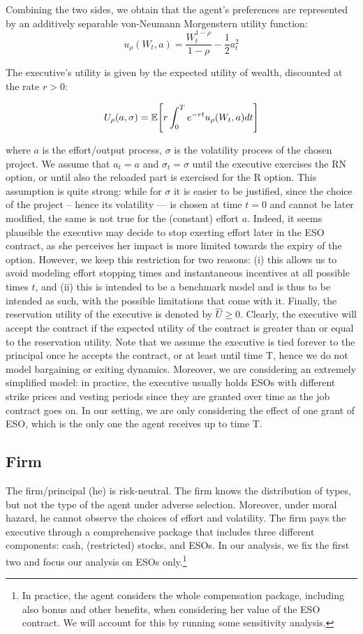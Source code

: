 Combining the two sides, we obtain that the agent's preferences are represented by an additively separable von-Neumann Morgenstern utility function:
$$ u_\rho (W_t, a) = \frac{W_t^{1-\rho}}{1-\rho} - \frac{1}{2}a_t^2 $$

The executive's utility is given by the expected utility of wealth, discounted at the rate $r>0$:

$$ U_\rho (a, \sigma) = \operatorname{\mathbb{E}} \Biggl[r \int_{0}^{T} e^{-rt} u_\rho (W_t, a) dt \Biggr]$$

where $a$ is the effort/output process, $\sigma$ is the volatility process of the chosen project. We assume that $a_t=a$ and $\sigma_t=\sigma$ until the executive exercises the RN option, or until also the reloaded part is exercised for the R option. This assumption is quite strong: while for $\sigma$ it is easier to be justified, since the choice of the project -- hence its volatility --- is chosen at time $t=0$ and cannot be later modified, the same is not true for the (constant) effort $a$. Indeed, it seems plausible the executive may decide to stop exerting effort later in the ESO contract, as she perceives her impact is more limited towards the expiry of the option. However, we keep this restriction for two reasons: (i) this allows us to avoid modeling effort stopping times and instantaneous incentives at all possible times $t$, and (ii) this is intended to be a benchmark model and is thus to be intended as such, with the possible limitations that come with it. Finally, the reservation utility of the executive is denoted by $\hat{U} \ge 0$. Clearly, the executive will accept the contract if the expected utility of the contract is greater than or equal to the reservation utility.
Note that we assume the executive is tied forever to the principal once he accepts the contract, or at least until time T, hence we do not model bargaining or exiting dynamics. Moreover, we are considering an extremely simplified model: in practice, the executive usually holds ESOs with different strike prices and vesting periods since they are granted over time as the job contract goes on. In our setting, we are only considering the effect of one grant of ESO, which is the only one the agent receives up to time T. 

\subsection{Firm}
The firm/principal (he) is risk-neutral. The firm knows the distribution of types, but not the type of the agent under adverse selection. Moreover, under moral hazard, he cannot observe the choices of effort and volatility. 
The firm pays the executive through a comprehensive package that includes three different components: cash, (restricted) stocks, and ESOs. In our analysis, we fix the first two and focus our analysis on ESOs only.\footnote{In practice, the agent considers the whole compensation package, including also bonus and other benefits, when considering her value of the ESO contract. We will account for this by running some sensitivity analysis.} 


